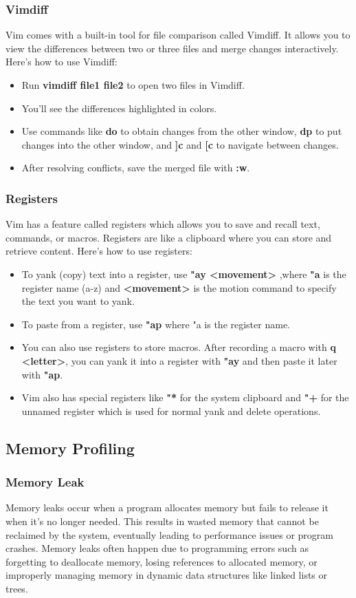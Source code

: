 \documentclass[titlepage]{article}
\begin{document}
\subsubsection{Vimdiff}
Vim comes with a built-in tool for file comparison called Vimdiff. It allows you to view the differences between two or three files and merge changes interactively. Here's how to use Vimdiff:

\begin{itemize}
\item Run \textbf{vimdiff file1 file2} to open two files in Vimdiff.
\item You'll see the differences highlighted in colors.
\item Use commands like \textbf{do} to obtain changes from the other window, \textbf{dp} to put changes into the other window, and\textbf{ ]c} and \textbf{[c} to navigate between changes.
\item After resolving conflicts, save the merged file with \textbf{:w}.
\end{itemize}

\subsubsection{Registers}
Vim has a feature called registers which allows you to save and recall text, commands, or macros. Registers are like a clipboard where you can store and retrieve content. Here's how to use registers:

\begin{itemize}
\item To yank (copy) text into a register, use \textbf{"ay <movement>} ,where \textbf{"a} is the register name (a-z) and \textbf{<movement>} is the motion command to specify the text you want to yank.
\item To paste from a register, use \textbf{"ap} where "a is the register name.
\item You can also use registers to store macros. After recording a macro with \textbf{q <letter>}, you can yank it into a register with \textbf{"ay} and then paste it later with \textbf{"ap}.
\item Vim also has special registers like \textbf{"*} for the system clipboard and \textbf{"+} for the unnamed register which is used for normal yank and delete operations.
\end{itemize}

\subsection{Memory Profiling}
\subsubsection{Memory Leak}

Memory leaks occur when a program allocates memory but fails to release it when it's no longer needed. This results in wasted memory that cannot be reclaimed by the system, eventually leading to performance issues or program crashes. Memory leaks often happen due to programming errors such as forgetting to deallocate memory, losing references to allocated memory, or improperly managing memory in dynamic data structures like linked lists or trees.
\end{document}
